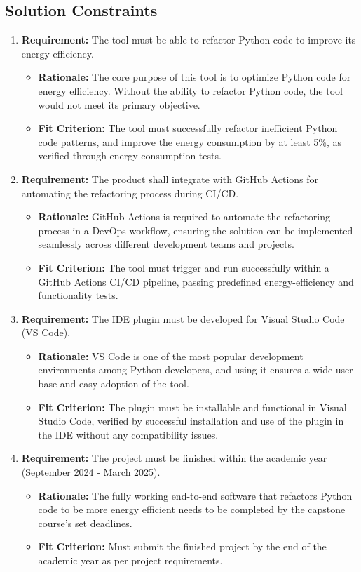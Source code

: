 \documentclass[12pt]{article}
\begin{document}
\subsection{Solution Constraints}
\begin{enumerate}
    \item \textbf{Requirement:} The tool must be able to refactor Python code to improve its energy efficiency.
    \begin{itemize}
        \item \textbf{Rationale:} The core purpose of this tool is to optimize Python code for energy efficiency. Without the ability to refactor Python code, the tool would not meet its primary objective.
        \item \textbf{Fit Criterion:} The tool must successfully refactor inefficient Python code patterns, and improve the energy consumption by at least 5\%, as verified through energy consumption tests.
    \end{itemize}
    \item \textbf{Requirement:} The product shall integrate with GitHub Actions for automating the refactoring process during CI/CD.
    \begin{itemize}
        \item \textbf{Rationale:} GitHub Actions is required to automate the refactoring process in a DevOps workflow, ensuring the solution can be implemented seamlessly across different development teams and projects.
        \item \textbf{Fit Criterion:} The tool must trigger and run successfully within a GitHub Actions CI/CD pipeline, passing predefined energy-efficiency and functionality tests.
    \end{itemize}
    \item \textbf{Requirement:} The IDE plugin must be developed for Visual Studio Code (VS Code).
    \begin{itemize}
        \item \textbf{Rationale:} VS Code is one of the most popular development environments among Python developers, and using it ensures a wide user base and easy adoption of the tool.
        \item \textbf{Fit Criterion:} The plugin must be installable and functional in Visual Studio Code, verified by successful installation and use of the plugin in the IDE without any compatibility issues.
    \end{itemize}
    \item \textbf{Requirement:} The project must be finished within the academic year (September 2024 - March 2025).
    \begin{itemize}
        \item \textbf{Rationale:} The fully working end-to-end software that refactors Python code to be more energy efficient needs to be completed by the capstone course's set deadlines.
        \item \textbf{Fit Criterion:} Must submit the finished project by the end of the academic year as per project requirements.
    \end{itemize}
\end{enumerate}
\end{document}
